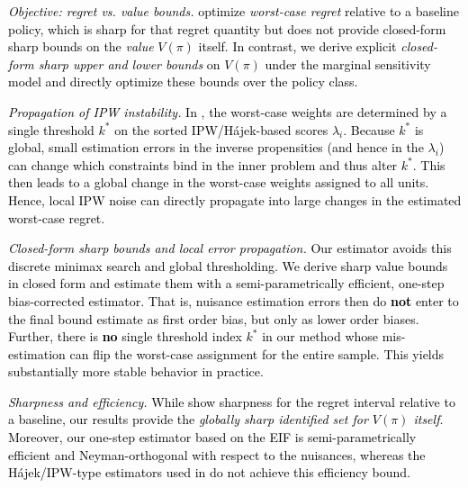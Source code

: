 \documentclass{article} %
\theoremstyle{plain}
\theoremstyle{definition}
\theoremstyle{remark}
\newcommand{\rebuttal}[1]{\textcolor{black}{#1}}
\begin{document}
\begin{itemize}[leftmargin=1.5em]
\item \rebuttal{\emph{Objective: regret vs. value bounds.} \citet{Kallus.2018c,Kallus.2021d} optimize \emph{worst-case regret} relative to a baseline policy, which is sharp for that regret quantity but does not provide closed-form sharp bounds on the \emph{value} $V(\pi)$ itself. In contrast, we derive explicit \emph{closed-form sharp upper and lower bounds} on $V(\pi)$ under the marginal sensitivity model and directly optimize these bounds over the policy class.}

\rebuttal{\item \emph{Propagation of IPW instability.} In \citet{Kallus.2018c,Kallus.2021d}, the worst-case weights are determined by a single threshold $k^\ast$ on the sorted IPW/Hájek-based scores $\lambda_i$. Because $k^\ast$ is global, small estimation errors in the inverse propensities (and hence in the $\lambda_i$) can change which constraints bind in the inner problem and thus alter $k^\ast$. This then leads to a global change in the worst-case weights assigned to all units. Hence, local IPW noise can directly propagate into large changes in the estimated worst-case regret.}

\rebuttal{\item \emph{Closed-form sharp bounds and local error propagation.} Our estimator avoids this discrete minimax search and global thresholding. We derive sharp value bounds in closed form and estimate them with a semi-parametrically efficient, one-step bias-corrected estimator. That is, nuisance estimation errors then do \textbf{not} enter to the final bound estimate as first order bias, but only as lower order biases. Further, there is \textbf{no} single threshold index $k^\ast$ in our method whose mis-estimation can flip the worst-case assignment for the entire sample. This yields substantially more stable behavior in practice.}

\rebuttal{\item \emph{Sharpness and efficiency.} While \citet{Kallus.2018c,Kallus.2021d} show sharpness for the regret interval relative to a baseline, our results provide the \emph{globally sharp identified set for $V(\pi)$ itself}. Moreover, our one-step estimator based on the EIF is semi-parametrically efficient and Neyman-orthogonal with respect to the nuisances, whereas the Hájek/IPW-type estimators used in \citep{Kallus.2018c,Kallus.2021d} do not achieve this efficiency bound.}


\end{itemize}
\end{document}

